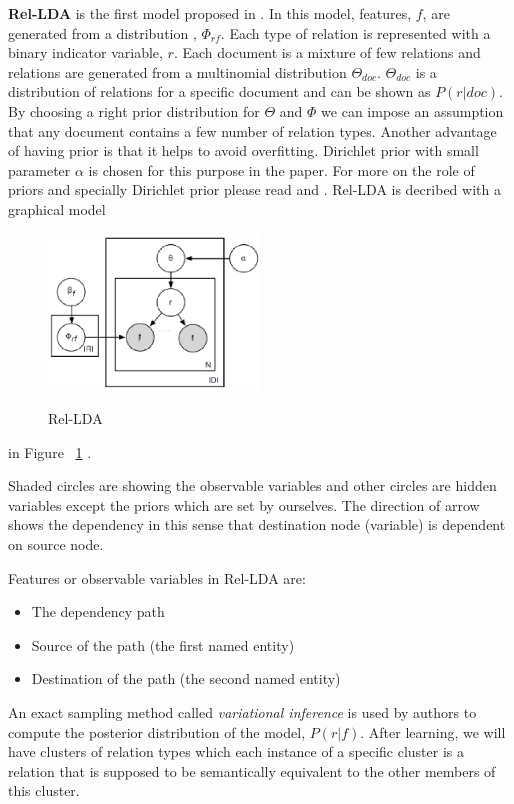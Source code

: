 \documentclass[12pt]{report}
\begin{document}
\textbf{Rel-LDA} is the first model proposed in \cite{Riedel2013}. 
In this model, features, $f$, are generated from a distribution , $\Phi_{rf}$. Each type
 of relation is represented with a binary indicator variable, $r$. Each document is a mixture of few relations
  and relations are generated from a multinomial distribution $\Theta_{doc}$. $\Theta_{doc}$ is a distribution
  of relations for a specific document and can be shown as $P(r|doc)$. By choosing a right prior distribution for $\Theta$
   and $\Phi$ we can impose an assumption that any document contains a few number of relation types. 
   Another advantage of having prior is that it helps to avoid overfitting. Dirichlet prior with small parameter $\alpha$ is 
   chosen for this purpose in the paper. For more on the role of priors and specially Dirichlet prior
    please read \cite{Teh2007} and \cite{Gershman2012} .
    Rel-LDA is decribed with a graphical model 
     \begin{figure}[h!]
  \caption{Rel-LDA}
  \centering
    \includegraphics[width=0.5\textwidth]{rel-lda.eps}
    \label{fig:rel-lda}
\end{figure} in Figure ~\ref{fig:rel-lda} .
     
    Shaded circles are showing the observable variables and other circles are hidden variables except 
    the priors which are set by ourselves. The direction of arrow shows the dependency in this sense 
    that destination node (variable) is dependent on source node.
      
    Features or observable variables in Rel-LDA are:
    \begin{itemize}
      \item The dependency path
      \item Source of the path (the first named entity)
      \item Destination of the path (the second named entity)
    \end{itemize}
   	
   	An exact sampling method called \emph{variational inference} is used by authors to compute 
   	the posterior distribution of the model, $P(r|f)$.
   	After learning, we will have clusters of relation types which each instance of a specific cluster 
   	is a relation that is supposed to be semantically equivalent to the other members of this cluster.
   	\\
   	
\end{document}

